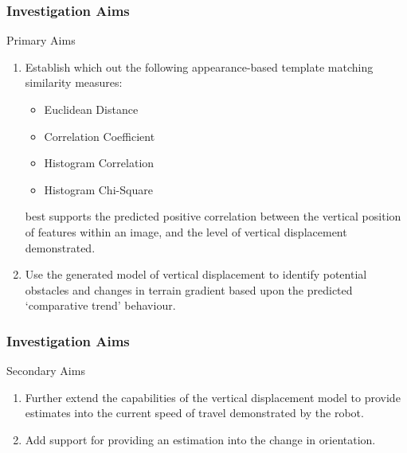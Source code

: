 \documentclass[10pt, compress]{beamer}
\begin{document}
\begin{frame}[fragile]
  \frametitle{Investigation Aims}
	
	 \vspace{-7pt}
	 
  \begin{block}{Primary Aims}
  
  	  \begin{enumerate}[label={\arabic*.}]
  \item Establish which out the following appearance-based template matching similarity measures:

  \vspace{2pt}
 {\small \begin{itemize}[label={\textbullet}]
  	\item Euclidean Distance
  	\item Correlation Coefficient
  	\item Histogram Correlation
  	\item Histogram Chi-Square
  \end{itemize} }
  \vspace{2pt}
  best supports the predicted positive correlation between the vertical position of features within an image, and the level of vertical displacement demonstrated.
 
 \vspace{10pt}
 
  \item Use the generated model of vertical displacement to identify potential obstacles and changes in terrain gradient based upon the predicted ‘comparative trend’ behaviour.
\end{enumerate}

  \end{block}

\end{frame}

\begin{frame}[fragile]
  \frametitle{Investigation Aims}

  \begin{block}{Secondary Aims}
  
  	  \begin{enumerate}[label={\arabic*.}]
  	  
  \item Further extend the capabilities of the vertical displacement model to provide estimates into the current speed of travel demonstrated by the robot.

  \item Add support for providing an estimation into the change in orientation.
 
\end{enumerate}

  \end{block}

\end{frame}
\end{document}
